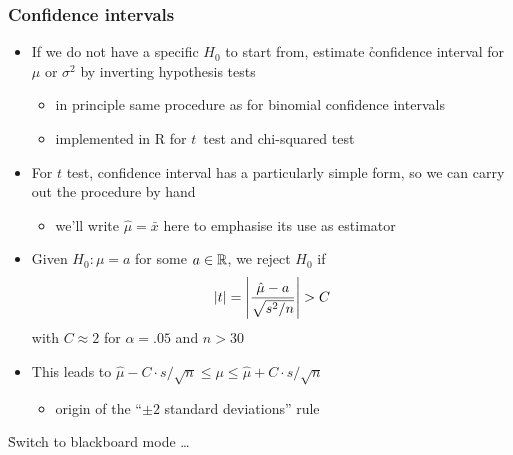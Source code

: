 \documentclass[handout,notes=show,t]{beamer} %
\begin{document}
\begin{frame}
  \frametitle{Confidence intervals}
  
  \begin{itemize}
  \item If we do not have a specific $H_0$ to start from, estimate
    \h{confidence interval} for $\mu$ or $\sigma^2$ by inverting hypothesis
    tests
    \begin{itemize}
    \item in principle same procedure as for binomial confidence intervals
    \item implemented in R for $t$~test and chi-squared test
    \end{itemize}
  \item For $t$ test, confidence interval has a particularly simple form, so
    we can carry out the procedure by hand
    \begin{itemize}
    \item we'll write $\hat{\mu} = \bar{x}$ here to emphasise its use as
      estimator
    \end{itemize}
    \pause
  \item Given $H_0: \mu = a$ for some $a\in\mathbb{R}$, we reject $H_0$ if
    \[
    \lvert t\rvert = \left\lvert \frac{\hat{\mu} - a}{\sqrt{s^2 / n}}\right\rvert > C
    \]
    with $C\approx 2$ for $\alpha = .05$ and $n > 30$%
    \pause
  \item This leads to $\hat{\mu} - C\cdot s / \sqrt{n} \leq \mu \leq
    \hat{\mu} + C\cdot s / \sqrt{n}$
    \begin{itemize}
    \item[\hand] origin of the ``$\pm 2$ standard deviations'' rule
    \end{itemize}
  \end{itemize}
\end{frame}





\begin{frame}[c]

  \begin{center}
    \h{\Large Switch to blackboard mode \ldots}
  \end{center}
\end{frame}
\end{document}
